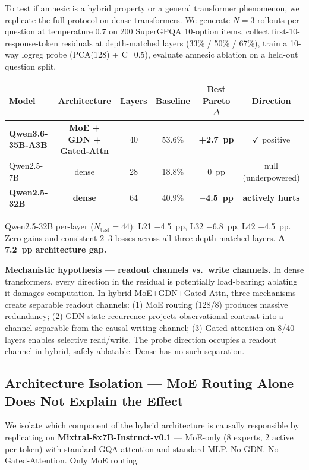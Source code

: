 \documentclass[11pt]{article}
\begin{document}
To test if amnesic is a hybrid property or a general transformer phenomenon, we replicate the full protocol on dense transformers. We generate $N=3$ rollouts per question at temperature 0.7 on 200 SuperGPQA 10-option items, collect first-10-response-token residuals at depth-matched layers (33\% / 50\% / 67\%), train a 10-way logreg probe (PCA(128) + C=0.5), evaluate amnesic ablation on a held-out question split.

\begin{table}[h]
\centering
\begin{tabular}{lccccc}
\toprule
Model & Architecture & Layers & Baseline & Best Pareto $\Delta$ & Direction \\
\midrule
\textbf{Qwen3.6-35B-A3B} & \textbf{MoE + GDN + Gated-Attn} & 40 & 53.6\% & \textbf{+2.7~pp} & $\checkmark$ positive \\
Qwen2.5-7B & dense & 28 & 18.8\% & 0~pp & null (underpowered) \\
\textbf{Qwen2.5-32B} & \textbf{dense} & 64 & 40.9\% & \textbf{$-$4.5~pp} & \textbf{actively hurts} \\
\bottomrule
\end{tabular}
\end{table}

Qwen2.5-32B per-layer ($N_\text{test} = 44$): L21 $-$4.5~pp, L32 $-$6.8~pp, L42 $-$4.5~pp. Zero gains and consistent 2--3 losses across all three depth-matched layers. \textbf{A 7.2~pp architecture gap.}

\textbf{Mechanistic hypothesis --- readout channels vs.\ write channels.} In dense transformers, every direction in the residual is potentially load-bearing; ablating it damages computation. In hybrid MoE+GDN+Gated-Attn, three mechanisms create separable readout channels: (1) MoE routing (128/8) produces massive redundancy; (2) GDN state recurrence projects observational contrast into a channel separable from the causal writing channel; (3) Gated attention on 8/40 layers enables selective read/write. The probe direction occupies a readout channel in hybrid, safely ablatable. Dense has no such separation.

\subsection{Architecture Isolation --- MoE Routing Alone Does Not Explain the Effect}\label{sec:isolation}

We isolate which component of the hybrid architecture is causally responsible by replicating on \textbf{Mixtral-8x7B-Instruct-v0.1} --- MoE-only (8 experts, 2 active per token) with standard GQA attention and standard MLP. No GDN. No Gated-Attention. Only MoE routing.
\end{document}
